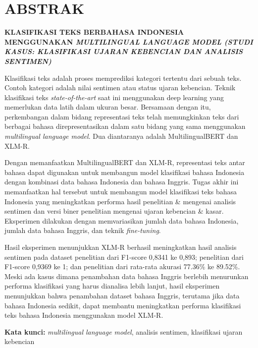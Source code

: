\clearpage
\chapter*{ABSTRAK}
\begin{center} 
    \large \bfseries \MakeUppercase{Klasifikasi Teks Berbahasa Indonesia Menggunakan \textit{Multilingual Language Model (Studi Kasus: Klasifikasi Ujaran Kebencian dan Analisis Sentimen)}} 

    \normalsize {}
\end{center}


Klasifikasi teks adalah proses memprediksi kategori tertentu dari sebuah teks. Contoh kategori adalah nilai sentimen atau status ujaran kebencian. Teknik klasifikasi teks \textit{state-of-the-art} saat ini menggunakan deep learning yang memerlukan data latih dalam ukuran besar. Bersamaan dengan itu, perkembangan dalam bidang representasi teks telah memungkinkan teks dari berbagai bahasa direpresentasikan dalam satu bidang yang sama menggunakan \textit{multilingual language model}. Dua diantaranya adalah MultilingualBERT \parencite{Devlin_Chang_Lee_Toutanova_2019} dan XLM-R\parencite{Conneau_XLMR}.

Dengan memanfaatkan MultilingualBERT dan XLM-R, representasi teks antar bahasa dapat digunakan untuk membangun model klasifikasi bahasa Indonesia dengan kombinasi data bahasa Indonesia dan bahasa Inggris. Tugas akhir ini memanfaatkan hal tersebut untuk membangun model klasifikasi teks bahasa Indonesia yang meningkatkan performa hasil penelitian \parencite{FarhanKhodra2017} \& \parencite{CrisdayantiPurwarianti2019} mengenai analisis sentimen dan versi biner penelitian \parencite{Ibrohim_Budi_2019} mengenai ujaran kebencian \& kasar. Eksperimen dilakukan dengan memvariasikan jumlah data bahasa Indonesia, jumlah data bahasa Inggris, dan teknik \textit{fine-tuning}.

Hasil eksperimen menunjukkan XLM-R berhasil meningkatkan hasil analisis sentimen pada dataset penelitian \parencite{FarhanKhodra2017} dari F1-score 0,8341 ke 0,893; penelitian \parencite{CrisdayantiPurwarianti2019} dari F1-score 0,9369 ke 1; dan penelitian \parencite{Ibrohim_Budi_2019} dari rata-rata akurasi 77.36\% ke 89.52\%. Meski ada kasus dimana penambahan data bahasa Inggris berlebih menurunkan performa klasifikasi yang harus dianalisa lebih lanjut, hasil eksperimen menunjukkan bahwa penambahan dataset bahasa Inggris, terutama jika data bahasa Indonesia sedikit, dapat membantu meningkatkan performa klasifikasi teks bahasa Indonesia menggunakan model XLM-R.

\textbf{Kata kunci:} \textit{multilingual language model}, analisis sentimen, klasifikasi ujaran kebencian
\clearpage